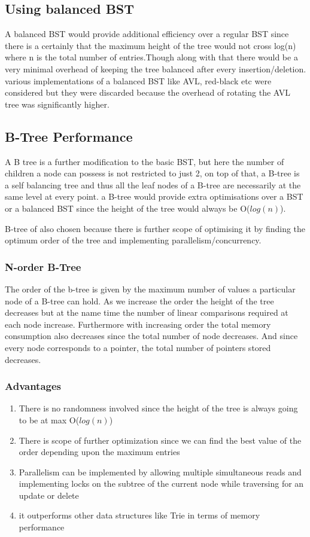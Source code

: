 \documentclass{article}
\begin{document}
\subsection{Using balanced BST}
A balanced BST would provide additional efficiency over a regular BST since there is a certainly that the maximum height of the tree would not cross log(n) where n is the total number of entries.Though along with that there would be a very minimal overhead of keeping the tree balanced after every insertion/deletion.
various implementations of a balanced BST like AVL, red-black etc were considered but they were discarded because the overhead of rotating the AVL tree was significantly higher. 

\subsection{B-Tree Performance}

A B tree is a further modification to the basic BST, but here the number of children a node can possess is not restricted to just 2, on top of that, a B-tree is a self balancing tree and thus all the leaf nodes of a B-tree are necessarily at the same level at every point.
a B-tree would provide extra optimisations over a BST or a balanced BST since the height of the tree would always be O($log(n)$).

B-tree of also chosen because there is further scope of optimising it by finding the optimum order of the tree and implementing parallelism/concurrency. 

\subsubsection{N-order B-Tree}
The order of the b-tree is given by the maximum number of values a particular node of a B-tree can hold. As we increase the order the height of the tree decreases but at the name time the number of linear comparisons required at each node increase. Furthermore with increasing order the total memory consumption also decreases since the total number of node decreases. And since every node corresponds to a pointer, the total number of pointers stored decreases. 

\subsubsection{Advantages}

\begin{enumerate}
    \item There is no randomness involved since the height of the tree is always going to be at max O($log(n)$)
    \item There is scope of further optimization since we can find the best value of the order depending upon the maximum entries 
    \item Parallelism can be implemented by allowing multiple  simultaneous reads and implementing locks on the subtree of the current node while traversing for an update or delete 
    \item it outperforms other data structures like Trie in terms of memory performance 
\end{enumerate}
\end{document}
